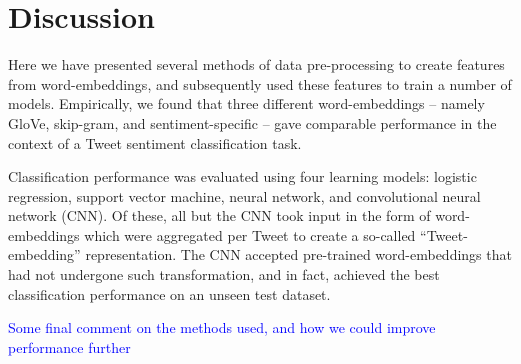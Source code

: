 \section{Discussion}
\label{sec:discussion}

Here we have presented several methods of data pre-processing to create features from word-embeddings, and subsequently used these features to train a number of models. Empirically, we found that three different word-embeddings -- namely GloVe, skip-gram, and sentiment-specific -- gave comparable performance in the context of a Tweet sentiment classification task.

Classification performance was evaluated using four learning models: logistic regression, support vector machine, neural network, and convolutional neural network (CNN). Of these, all but the CNN took input in the form of word-embeddings which were aggregated per Tweet to create a so-called ``Tweet-embedding'' representation. The CNN accepted pre-trained word-embeddings that had not undergone such transformation, and in fact, achieved the best classification performance on an unseen test dataset.

\textcolor{blue}{Some final comment on the methods used, and how we could improve performance further}
